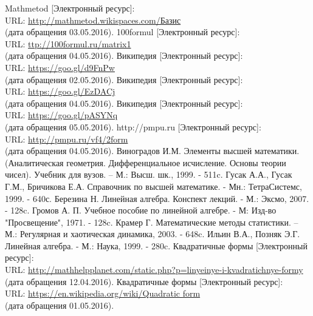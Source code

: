 \documentclass[bachelor, och, coursework, times]{SCWorks}
\begin{document}
\begin{thebibliography}{00} %
Mathmetod [Электронный ресурс]:\\
URL: \href{http://mathmetod.wikispaces.com/Базис}{http://mathmetod.wikispaces.com/Базис} \\ (дата обращения 03.05.2016).
100formul [Электронный ресурс]:\\
URL: \href{ttp://100formul.ru/matrix1}{ttp://100formul.ru/matrix1} 
\\ (дата обращения 04.05.2016).
Википедия [Электронный ресурс]:\\
URL: \href{https://goo.gl/d9FnPw}{https://goo.gl/d9FnPw}
\\ (дата обращения 02.05.2016).
Википедия [Электронный ресурс]:\\
URL: \href{https://goo.gl/EzDACj}{https://goo.gl/EzDACj}
\\ (дата обращения 04.05.2016).
Википедия [Электронный ресурс]:\\
URL: \href{https://goo.gl/pASYNq}{https://goo.gl/pASYNq}
\\ (дата обращения 05.05.2016).
http://pmpu.ru [Электронный ресурс]:\\
URL: \href{http://pmpu.ru/vf4/2form}{http://pmpu.ru/vf4/2form}
\\ (дата обращения 04.05.2016).
Виноградов И.М. Элементы высшей математики. (Аналитическая геометрия. Дифференциальное исчисление. Основы теории чисел). Учебник для вузов. – М.: Высш. шк., 1999. - 511c.
Гусак А.А., Гусак Г.М., Бричикова Е.А. Справочник по высшей математике. - Мн.: ТетраСистемс, 1999. - 640с. 
Березина Н. Линейная алгебра. Конспект лекций. - М.: Эксмо, 2007. - 128c.
Громов А. П. Учебное пособие по линейной алгебре. - М: Изд-во "Просвещение", 1971. - 128c.
Крамер Г. Математические методы статистики. – М.: Регулярная и хаотическая динамика, 2003. - 648c.
Ильин В.А., Позняк Э.Г. Линейная алгебра. - М.: Наука, 1999. - 280c.
Квадратичные формы [Электронный ресурс]:\\
URL: \href{http://mathhelpplanet.com/static.php?p=linyeinye-i-kvadratichnye-formy}{http://mathhelpplanet.com/static.php?p=linyeinye-i-kvadratichnye-formy} (дата обращения 12.04.2016).
Квадратичные формы [Электронный ресурс]:\\
URL: \href{https://en.wikipedia.org/wiki/Quadratic\underline{ }form}{https://en.wikipedia.org/wiki/Quadratic\underline{ }form} \\ (дата обращения 01.05.2016).

\end{thebibliography}
\end{document}
